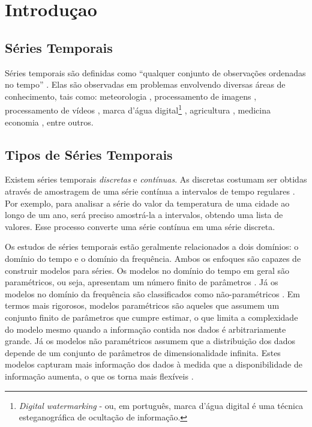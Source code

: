 \section{Introduçao}

 \subsection{Séries Temporais}
 \label{sec:SeriesTemporais}
Séries temporais são definidas como ``qualquer conjunto de observações ordenadas no tempo'' \cite{morettin2006analise}. Elas são observadas em problemas envolvendo diversas áreas de conhecimento, tais como: meteorologia \cite{7982030}, processamento de imagens \cite{7729869,7164182, 6723283}, processamento de vídeos \cite{6469509}, marca d'água digital\footnote{\textit{Digital watermarking} - ou, em português, marca d'água digital é uma técnica esteganográfica de ocultação de informação.} \cite{7024611}, agricultura \cite{6723610}, medicina \cite{6707296} economia \cite{4810671}, entre outros.
 
 \subsection{Tipos de Séries Temporais}
 Existem séries temporais \textit{discretas} e \textit{contínuas}. As discretas costumam ser obtidas através de amostragem de uma série contínua a intervalos de tempo regulares \cite{morettin2006analise,hyndman2018forecasting}. Por exemplo, para analisar a série do valor da temperatura de uma cidade ao longo de um ano, será preciso amostrá-la a intervalos, obtendo uma lista de valores. Esse processo converte uma série contínua em uma série discreta.

Os estudos de séries temporais estão geralmente relacionados a dois domínios: o domínio do tempo e o domínio da frequência. Ambos os enfoques são capazes de construir modelos para séries. Os modelos no domínio do tempo em geral são paramétricos, ou seja, apresentam um número finito de parâmetros \cite{conover1981rank}. Já os modelos no domínio da frequência são classificados como não-paramétricos \cite{hollander1999nonparametric}. Em termos mais rigorosos, modelos paramétricos são aqueles que assumem um conjunto finito de parâmetros que cumpre estimar, o que limita a complexidade do modelo mesmo quando a informação contida nos dados é arbitrariamente grande. Já os modelos não paramétricos assumem que a distribuição dos dados depende de um conjunto de parâmetros de dimensionalidade infinita. Estes modelos capturam mais informação dos dados à medida que a disponibilidade de informação aumenta, o que os torna mais flexíveis \cite{ChenNeural2001}.
 

